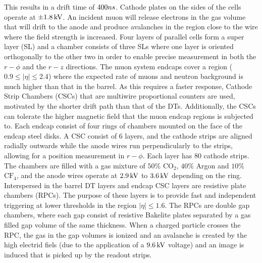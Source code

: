 This results in a drift time of $400ns$. Cathode plates on the sides of the cells operate at $\pm1.8\,\text{k\hspace{-.08em}V}$. 
An incident muon will release electrons in the gas volume that will drift to the anode and produce avalanches in the region close to the wire where the field strength is increased.
Four layers of parallel cells form a super layer (SL) and a chamber consists of three SLs where one layer is oriented orthogonally to the other two in order to enable precise measurement in both the $r-\phi$ and the $r-z$ directions.
The muon system endcaps cover a region ($0.9\leq|\eta|\leq2.4$) where the expected rate of muons and neutron background is much higher than that in the barrel. 
As this requires a faster response, Cathode Strip Chambers (CSCs) that are multiwire proportional counters are used, motivated by the shorter drift path than that of the DTs. 
Additionally, the CSCs can tolerate the higher magnetic field that the muon endcap regions is subjected to. 
Each endcap consist of four rings of chambers mounted on the face of the endcap steel disks. 
A CSC consist of 6 layers, and the cathode strips are aligned radially outwards while the anode wires run perpendicularly to the strips, allowing for a position measurement in $r-\phi$. 
Each layer has 80 cathode strips. 
The chambers are filled with a gas mixture of $50\%$ $\mathrm{CO_{2}}$, $40\%$ Argon and $10\%$ $\mathrm{CF_{4}}$, and the anode wires operate at $2.9\,\text{k\hspace{-.08em}V}$ to $3.6\,\text{k\hspace{-.08em}V}$ depending on the ring. 
Interspersed in the barrel DT layers and endcap CSC layers are resistive plate chambers (RPCs). 
The purpose of these layers is to provide fast and independent triggering at lower \pt thresholds in the region $|\eta|\leq1.6$. 
The RPCs are double gap chambers, where each gap consist of resistive Bakelite plates separated by a gas filled gap volume of the same thickness. 
When a charged particle crosses the RPC, the gas in the gap volumes is ionized and an avalanche is created by the high electrid fiels (due to the application of a $9.6\,\text{k\hspace{-.08em}V}$ voltage) and an image is induced that is picked up by the readout strips. 



